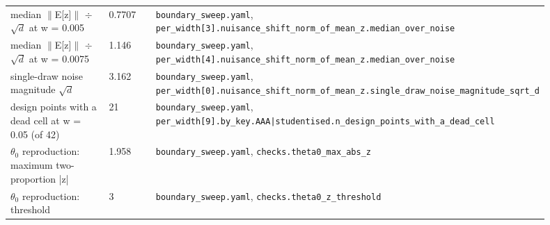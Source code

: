 \begin{longtable}{p{0.35\linewidth} p{0.14\linewidth} p{0.41\linewidth}}
median $\|$E[z]$\|$ $\div$ $\sqrt{d}$ at w = 0.005 & 0.7707 & \texttt{\footnotesize boundary\_\allowbreak{}sweep.\allowbreak{}yaml}, \texttt{\footnotesize per\_\allowbreak{}width[3].\allowbreak{}nuisance\_\allowbreak{}shift\_\allowbreak{}norm\_\allowbreak{}of\_\allowbreak{}mean\_\allowbreak{}z.\allowbreak{}median\_\allowbreak{}over\_\allowbreak{}noise} \\
median $\|$E[z]$\|$ $\div$ $\sqrt{d}$ at w = 0.0075 & 1.146 & \texttt{\footnotesize boundary\_\allowbreak{}sweep.\allowbreak{}yaml}, \texttt{\footnotesize per\_\allowbreak{}width[4].\allowbreak{}nuisance\_\allowbreak{}shift\_\allowbreak{}norm\_\allowbreak{}of\_\allowbreak{}mean\_\allowbreak{}z.\allowbreak{}median\_\allowbreak{}over\_\allowbreak{}noise} \\
single-draw noise magnitude $\sqrt{d}$ & 3.162 & \texttt{\footnotesize boundary\_\allowbreak{}sweep.\allowbreak{}yaml}, \texttt{\footnotesize per\_\allowbreak{}width[0].\allowbreak{}nuisance\_\allowbreak{}shift\_\allowbreak{}norm\_\allowbreak{}of\_\allowbreak{}mean\_\allowbreak{}z.\allowbreak{}single\_\allowbreak{}draw\_\allowbreak{}noise\_\allowbreak{}magnitude\_\allowbreak{}sqrt\_\allowbreak{}d} \\
design points with a dead cell at w = 0.05 (of 42) & 21 & \texttt{\footnotesize boundary\_\allowbreak{}sweep.\allowbreak{}yaml}, \texttt{\footnotesize per\_\allowbreak{}width[9].\allowbreak{}by\_\allowbreak{}key.\allowbreak{}AAA|\allowbreak{}studentised.\allowbreak{}n\_\allowbreak{}design\_\allowbreak{}points\_\allowbreak{}with\_\allowbreak{}a\_\allowbreak{}dead\_\allowbreak{}cell} \\
$\theta_0$ reproduction: maximum two-proportion |z| & 1.958 & \texttt{\footnotesize boundary\_\allowbreak{}sweep.\allowbreak{}yaml}, \texttt{\footnotesize checks.\allowbreak{}theta0\_\allowbreak{}max\_\allowbreak{}abs\_\allowbreak{}z} \\
$\theta_0$ reproduction: threshold & 3 & \texttt{\footnotesize boundary\_\allowbreak{}sweep.\allowbreak{}yaml}, \texttt{\footnotesize checks.\allowbreak{}theta0\_\allowbreak{}z\_\allowbreak{}threshold} \\
\bottomrule
\end{longtable}

